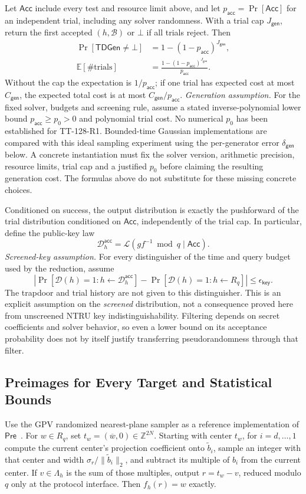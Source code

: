 \documentclass[lettersize,journal]{IEEEtran}
\begin{document}
Let $\mathsf{Acc}$ include every test and resource limit above, and let
$p_{\mathsf{acc}}=\Pr[\mathsf{Acc}]$ for an independent trial, including
any solver randomness. With a trial cap $J_{\mathsf{gen}}$, return the
first accepted $(h,\mathcal B)$ or $\bot$ if all trials reject. Then
\[
\begin{aligned}
\Pr[\mathsf{TDGen}\ne\bot]
 &=1-(1-p_{\mathsf{acc}})^{J_{\mathsf{gen}}},\\
\mathbb E[\#\text{trials}]
 &=\frac{1-(1-p_{\mathsf{acc}})^{J_{\mathsf{gen}}}}
         {p_{\mathsf{acc}}}.
\end{aligned}
\]
Without the cap the expectation is $1/p_{\mathsf{acc}}$; if one trial
has expected cost at most $C_{\mathsf{gen}}$, the expected total cost
is at most $C_{\mathsf{gen}}/p_{\mathsf{acc}}$.
\emph{Generation assumption.} For the fixed solver, budgets and
screening rule, assume a stated inverse-polynomial lower bound
$p_{\mathsf{acc}}\geq p_0>0$ and polynomial trial cost. No numerical
$p_0$ has been established for TT-128-R1. Bounded-time Gaussian
implementations are compared with this ideal sampling experiment using
the per-generator error $\delta_{\mathsf{gen}}$ below.
A concrete instantiation must fix the solver version, arithmetic
precision, resource limits, trial cap and a justified $p_0$ before
claiming the resulting generation cost. The formulas above do not
substitute for these missing concrete choices.

Conditioned on success, the output distribution is exactly the pushforward
of the trial distribution conditioned on $\mathsf{Acc}$, independently
of the trial cap. In particular, define the public-key law
\[
\mathcal D_h^{\mathsf{acc}}
=\mathcal L(gf^{-1}\bmod q\mid\mathsf{Acc}).
\]
\emph{Screened-key assumption.} For every distinguisher of the time and
query budget used by the reduction, assume
\[
\left|\Pr[\mathcal D(h)=1:h\leftarrow\mathcal D_h^{\mathsf{acc}}]
-\Pr[\mathcal D(h)=1:h\leftarrow R_q]\right|
\leq\epsilon_{\mathsf{key}}.
\]
The trapdoor and trial history are not given to this distinguisher.
This is an explicit assumption on the \emph{screened} distribution,
not a consequence proved here from unscreened NTRU key indistinguishability.
Filtering depends on secret coefficients and solver behavior, so even a
lower bound on its acceptance probability does not by itself justify
transferring pseudorandomness through that filter.

\subsection{Preimages for Every Target and Statistical Bounds}
\label{par:blue-preimage-contract}
Use the GPV randomized nearest-plane sampler as a reference
implementation of $\mathsf{Pre}$~\cite{GPV08}.
For $w\in R_q$, set $t_w=(\overline w,0)\in\mathbb Z^{2N}$.
Starting with center $t_w$, for $i=d,\ldots,1$ compute the current
center's projection coefficient onto $\widetilde b_i$, sample an integer
with that center and width $\sigma_r/\|\widetilde b_i\|_2$, and subtract
its multiple of $b_i$ from the current center. If $v\in\Lambda_h$ is
the sum of those multiples, output $r=t_w-v$, reduced modulo $q$ only
at the protocol interface. Then $f_h(r)=w$ exactly.
\end{document}
